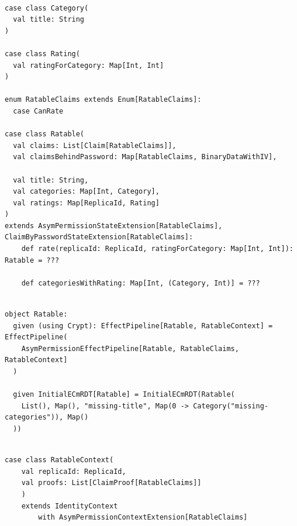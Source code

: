 \documentclass[
	ngerman,
	ruledheaders=section,   %
	class=report,		    %
	thesis={type=bachelor}, %
	accentcolor=9c,			%
	custommargins=false,    %
	marginpar=false,        %
	parskip=half-,          %
	fontsize=11pt,          %
]{tudapub}
\begin{document}
\begin{lstlisting}

case class Category(
  val title: String
)

case class Rating(
  val ratingForCategory: Map[Int, Int]
)

enum RatableClaims extends Enum[RatableClaims]:
  case CanRate

case class Ratable(
  val claims: List[Claim[RatableClaims]],
  val claimsBehindPassword: Map[RatableClaims, BinaryDataWithIV],

  val title: String,
  val categories: Map[Int, Category],
  val ratings: Map[ReplicaId, Rating]
)
extends AsymPermissionStateExtension[RatableClaims], ClaimByPasswordStateExtension[RatableClaims]:
	def rate(replicaId: ReplicaId, ratingForCategory: Map[Int, Int]): Ratable = ???

	def categoriesWithRating: Map[Int, (Category, Int)] = ???

\end{lstlisting}

\begin{lstlisting}

object Ratable:
  given (using Crypt): EffectPipeline[Ratable, RatableContext] = EffectPipeline(
    AsymPermissionEffectPipeline[Ratable, RatableClaims, RatableContext]
  )

  given InitialECmRDT[Ratable] = InitialECmRDT(Ratable(
    List(), Map(), "missing-title", Map(0 -> Category("missing-categories")), Map()
  ))

\end{lstlisting}

\begin{lstlisting}

case class RatableContext(
	val replicaId: ReplicaId,
	val proofs: List[ClaimProof[RatableClaims]]
	) 
	extends IdentityContext 
		with AsymPermissionContextExtension[RatableClaims]

\end{lstlisting}
\end{document}
